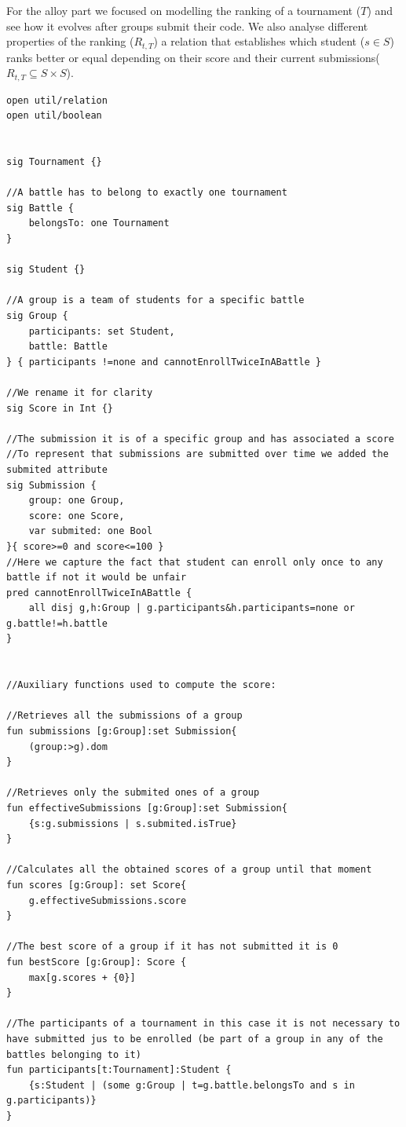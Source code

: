 For the alloy part we focused on modelling the ranking of a tournament ($T$) and see how it evolves after groups submit their code.
We also analyse different properties of the ranking ($R_{t,T}$) a relation that establishes which student ($s\in S$) ranks better or equal depending on their score and their current submissions($R_{t,T}\subseteq S\times S$).

\begin{lstlisting}[language=alloy]
open util/relation
open util/boolean


sig Tournament {}

//A battle has to belong to exactly one tournament
sig Battle {
	belongsTo: one Tournament
}

sig Student {}

//A group is a team of students for a specific battle
sig Group {
	participants: set Student,
	battle: Battle
} { participants !=none and cannotEnrollTwiceInABattle }

//We rename it for clarity
sig Score in Int {}
 
//The submission it is of a specific group and has associated a score
//To represent that submissions are submitted over time we added the submited attribute
sig Submission {
	group: one Group,
	score: one Score,
	var submited: one Bool
}{ score>=0 and score<=100 }
//Here we capture the fact that student can enroll only once to any battle if not it would be unfair
pred cannotEnrollTwiceInABattle {
	all disj g,h:Group | g.participants&h.participants=none or g.battle!=h.battle
}


//Auxiliary functions used to compute the score:

//Retrieves all the submissions of a group
fun submissions [g:Group]:set Submission{
	(group:>g).dom
}

//Retrieves only the submited ones of a group
fun effectiveSubmissions [g:Group]:set Submission{
	{s:g.submissions | s.submited.isTrue}
}

//Calculates all the obtained scores of a group until that moment
fun scores [g:Group]: set Score{
	g.effectiveSubmissions.score
}

//The best score of a group if it has not submitted it is 0
fun bestScore [g:Group]: Score {
	max[g.scores + {0}]
}

//The participants of a tournament in this case it is not necessary to have submitted jus to be enrolled (be part of a group in any of the battles belonging to it)
fun participants[t:Tournament]:Student {
	{s:Student | (some g:Group | t=g.battle.belongsTo and s in g.participants)}
}


\end{lstlisting}
